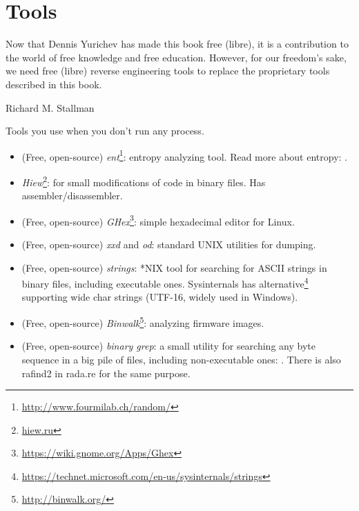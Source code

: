 \chapter{Tools}

\epigraph{Now that Dennis Yurichev has made this book free (libre), it is a
contribution to the world of free knowledge and free education.
However, for our freedom's sake, we need free (libre) reverse
engineering tools to replace the proprietary tools described in this book.}{Richard M. Stallman}


Tools you use when you don't run any process.


\begin{itemize}
\item
(Free, open-source) \emph{ent}\footnote{\url{http://www.fourmilab.ch/random/}}: entropy analyzing tool.
Read more about entropy: .

\item
\label{Hiew}
\emph{Hiew}\footnote{\href{http://go.yurichev.com/17035}{hiew.ru}}:
for small modifications of code in binary files.
Has assembler/disassembler.

\item (Free, open-source) \emph{GHex}\footnote{\url{https://wiki.gnome.org/Apps/Ghex}}: simple hexadecimal editor for Linux.

\item (Free, open-source) \emph{xxd} and \emph{od}: standard UNIX utilities for dumping.

\item (Free, open-source) \emph{strings}: *NIX tool for searching for ASCII strings in binary files, including executable ones.
Sysinternals has alternative\footnote{\url{https://technet.microsoft.com/en-us/sysinternals/strings}}
supporting wide char strings (UTF-16, widely used in Windows).

\item (Free, open-source) \emph{Binwalk}\footnote{\url{http://binwalk.org/}}: analyzing firmware images.

\item
{}
(Free, open-source) \emph{binary grep}:
a small utility for searching any byte sequence in a big pile of files,
including non-executable ones: \BGREPURL.
There is also rafind2 in rada.re for the same purpose.
\end{itemize}

